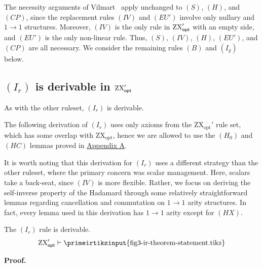 The necessity arguments of Vilmart~\cite{8785765} apply unchanged to \((S)\), \((H)\), and \((CP)\), since the replacement rules \((IV)\) and \((EU')\) involve only nullary and \(1\to1\) structures. Moreover, \((IV)\) is the only rule in \(\textup{ZX}_{\textsf{opt}}'\) with an empty side, and \((EU')\) is the only non-linear rule. Thus, \((S)\), \((IV)\), \((H)\), \((EU')\), and \((CP)\) are all necessary. We consider the remaining rules \((B)\) and \((I_g)\) below.

\subsection{\texorpdfstring{\((I_r)\)}{(Ir)} is derivable in \texorpdfstring{\(\textup{ZX}_{\textsf{opt}}'\)}{ZXopt'}}
\label{sec:zxoptprime-ir-rule-derivable}

As with the other ruleset, \((I_r)\) is derivable.

The following derivation of \hyperref[lem:zxoptprime-ir-rule-derivable]{\((I_r)\)} uses only axioms from the \(\mathrm{ZX}_{\mathrm{opt}}'\) rule set, which has some overlap with \(\mathrm{ZX}_{\mathrm{opt}}\), hence we are allowed to use the \hyperref[lem:ir-derivation-L1]{\((H_0)\)} and \hyperref[lem:ir-derivation-L2]{\((HC)\)} lemmas proved in \hyperref[app:ir-rule-derivation]{Appendix A}.

It is worth noting that this derivation for \hyperref[lem:zxoptprime-ir-rule-derivable]{\((I_r)\)} uses a different strategy than the other ruleset, where the primary concern was scalar management.  Here, scalars take a back-seat, since \hyperlink{rule:zxoptprime-IV}{\((IV)\)} is more flexible.  Rather, we focus on deriving the self-inverse property of the Hadamard through some relatively straightforward lemmas regarding cancellation and commutation on \(1 \to 1\) arity structures. In fact, every lemma used in this derivation has \(1 \to 1\) arity except for \hyperref[eq:prime-ir-Fig3Hx]{\((HX)\)}.

\begin{theorem}
\label{lem:zxoptprime-ir-rule-derivable}
The \((I_r)\) rule is derivable.
\begin{equation*}
\zxoptprime\vdash
\vcenter{\hbox{\primeirtikzinput{fig3-ir-theorem-statement.tikz}}}
\end{equation*}
\end{theorem}

\noindent\textbf{Proof.}
\begin{center}
\end{center}
\tombstone

